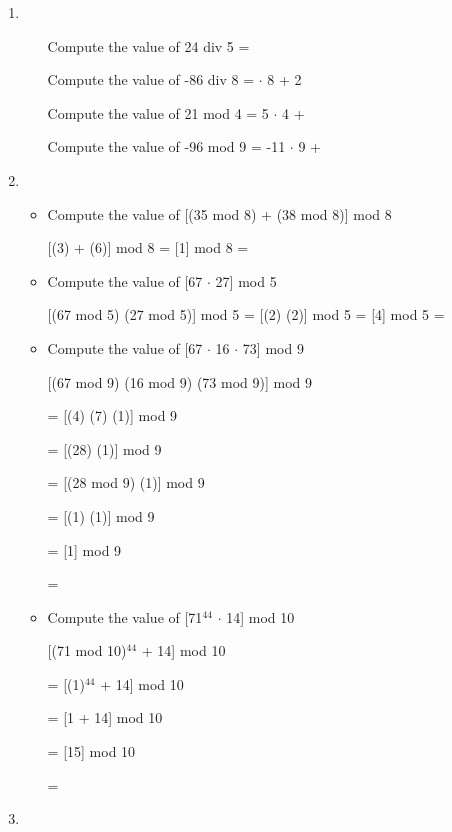 \documentclass[12pt,a4paper]{article}
\begin{document}
\clearpage
\begin{center}
  \large\textsc{}
\end{center}
\begin{enumerate}
  \item {}
  \begin{itemize}
    \item[] Compute the value of 24 div 5 = 
    \item[] Compute the value of -86 div 8 =  \(\cdot \) 8 + 2 
    \item[]  Compute the value of 21 mod 4 = 5 \(\cdot \) 4 + 
    \item[]  Compute the value of -96 mod 9 = -11 \(\cdot \) 9 +  
  \end{itemize}
  \item {} 
  \begin{itemize}
    \item Compute the value of [(35 mod 8) + (38 mod 8)] mod 8
    \item[] [(3) + (6)] mod 8 = [1] mod 8 = 
    \item Compute the value of [67 \(\cdot \) 27] mod 5
    \item[] [(67 mod 5) (27 mod 5)] mod 5 = [(2) (2)] mod 5 = [4] mod 5 = 
    \item Compute the value of [67 \(\cdot \) 16 \(\cdot \) 73] mod 9
    \item[] [(67 mod 9) (16 mod 9) (73 mod 9)] mod 9 
    \item[] = [(4) (7) (1)] mod 9 
    \item[] = [(28) (1)] mod 9
    \item[] = [(28 mod 9) (1)] mod 9
    \item[] = [(1) (1)] mod 9 
    \item[] = [1] mod 9
    \item[] = 
    \item Compute the value of [71\(^{44}\) \(\cdot \) 14] mod 10
    \item[] [(71 mod 10)\(^{44}\) + 14] mod 10
    \item[] = [(1)\(^{44}\) + 14] mod 10 
    \item[] = [1 + 14] mod 10 
    \item[] = [15] mod 10
    \item[] =  
  \end{itemize}
  \item {}

\end{enumerate}
\end{document}
